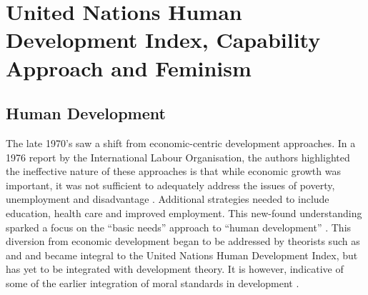 \section{United Nations Human Development Index, Capability Approach and Feminism}

\subsection{Human Development}

The late 1970's saw a shift from economic-centric development approaches. In a 1976 report by the International Labour Organisation, the authors highlighted the ineffective nature of these approaches is that while economic growth was important, it was not sufficient to adequately address the issues of poverty, unemployment and disadvantage \citep{Vakil2001}. Additional strategies needed to include education, health care and improved employment. This new-found understanding sparked a focus on the “basic needs” approach to “human development” \citep{Vakil2001}. This diversion from economic development began to be addressed by theorists such as \citet{Haq1996} and \citet{Sen2006a,Sen1983} and became integral to the United Nations Human Development Index, but has yet to be integrated with development theory. It is however, indicative of some of the earlier integration of moral standards in development \citep{Vakil2001,Karlberg2016}. %





